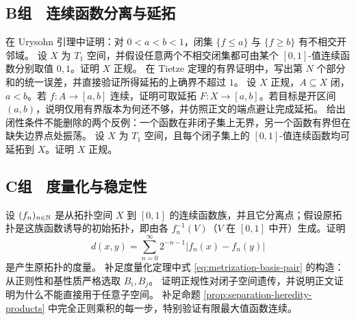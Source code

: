 \subsection*{B组　连续函数分离与延拓}
\begin{enumerate}[label=\textbf{\thechapter.\arabic*.},resume]
 在 Urysohn 引理中证明：对 \(0<a<b<1\)，闭集
 \(\{f\le a\}\) 与 \(\{f\ge b\}\) 有不相交开邻域。
 设 \(X\) 为 \(T_1\) 空间，并假设任意两个不相交闭集都可由某个 \([0,1]\)-值连续函数分别取值 \(0,1\)。证明 \(X\) 正规。
 在 Tietze 定理的有界证明中，写出第 \(N\) 个部分和的统一误差，并直接验证所得延拓的上确界不超过 \(1\)。
 设 \(X\) 正规，\(A\subseteq X\) 闭，\(a<b\)。若 \(f:A\to[a,b]\) 连续，证明可取延拓 \(F:X\to[a,b]\)。若目标是开区间 \((a,b)\)，说明仅用有界版本为何还不够，并仿照正文的端点避让完成延拓。
 给出闭性条件不能删除的两个反例：一个函数在非闭子集上无界，另一个函数有界但在缺失边界点处振荡。
 设 \(X\) 为 \(T_1\) 空间，且每个闭子集上的 \([0,1]\)-值连续函数均可延拓到 \(X\)。证明 \(X\) 正规。
\end{enumerate}

\subsection*{C组　度量化与稳定性}
\begin{enumerate}[label=\textbf{\thechapter.\arabic*.},resume]
 设 \((f_n)_{n\in\mathbb{N}}\) 是从拓扑空间 \(X\) 到 \([0,1]\) 的连续函数族，并且它分离点；假设原拓扑是这族函数诱导的初始拓扑，即由各 \(f_n^{-1}(V)\)（\(V\) 在 \([0,1]\) 中开）生成。证明
 \[
 d(x,y)=\sum_{n=0}^{\infty}2^{-n-1}|f_n(x)-f_n(y)|
 \]
 是产生原拓扑的度量。
 补足度量化定理中式 \eqref{eq:metrization-basis-pair} 的构造：从正则性和基性质严格选取 \(B_i,B_j\)。
 证明正规性对闭子空间遗传，并说明正文证明为什么不能直接用于任意子空间。
 补足命题 \ref{prop:separation-heredity-products} 中完全正则乘积的每一步，特别验证有限最大值函数连续。
\end{enumerate}
